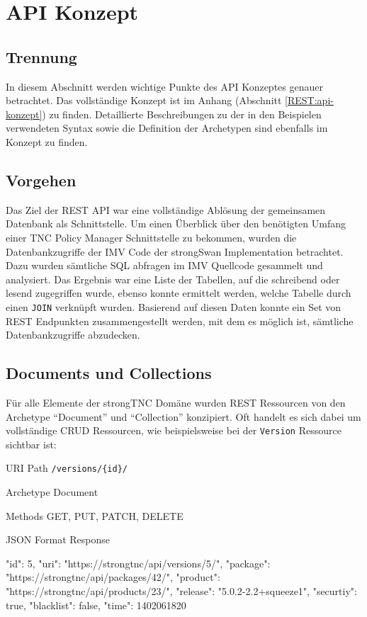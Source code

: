 \chapter{API Konzept}
\section{Trennung}

In diesem Abschnitt werden wichtige Punkte des API Konzeptes genauer betrachtet.
Das vollständige Konzept ist im Anhang (Abschnitt \ref{REST:api-konzept}) zu
finden. Detaillierte Beschreibungen zu der in den Beispielen verwendeten Syntax
sowie die Definition der Archetypen sind ebenfalls im Konzept zu finden.

\section{Vorgehen}
Das Ziel der REST API war eine vollständige Ablösung der gemeinsamen Datenbank
als Schnittstelle. Um einen Überblick über den benötigten Umfang einer TNC
Policy Manager Schnittstelle zu bekommen, wurden die Datenbankzugriffe der IMV
Code der strongSwan Implementation betrachtet. Dazu wurden sämtliche SQL
abfragen im IMV Quellcode gesammelt und analysiert. Das Ergebnis war eine Liste
der Tabellen, auf die schreibend oder lesend zugegriffen wurde, ebenso konnte
ermittelt werden, welche Tabelle durch einen \texttt{JOIN} verknüpft wurden.
Basierend auf diesen Daten konnte ein Set von REST Endpunkten zusammengestellt
werden, mit dem es möglich ist, sämtliche Datenbankzugriffe abzudecken.

\section{Documents und Collections}
Für alle Elemente der strongTNC Domäne wurden REST Ressourcen von den Archetype
\enquote{Document} und \enquote{Collection} konzipiert. Oft handelt es sich
dabei um vollständige CRUD Ressourcen, wie beispielsweise bei der
\texttt{Version} Ressource sichtbar ist:

\begin{mdframed}[style=def]
\begin{description*}
	\item[URI Path] \texttt{/versions/\{id\}/}
	\item[Archetype] Document
	\item[Methods] GET, PUT, PATCH, DELETE
	\item[JSON Format Response] \hfill
\begin{jsoncode}
{
	"id": 5,
	"uri": "https://strongtnc/api/versions/5/",
	"package": "https://strongtnc/api/packages/42/",
	"product": "https://strongtnc/api/products/23/",
	"release": "5.0.2-2.2+squeeze1",
	"securtiy": true,
	"blacklist": false,
	"time": 1402061820
}
\end{jsoncode}
\end{description*}
\end{mdframed}

